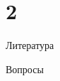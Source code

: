 \documentclass[12pt]{beamer}
\begin{document}
\part{2}

\begin{frame}[t]{Литература}

\end{frame}

\begin{frame}[t]{Вопросы}
\vspace{0.7cm}
 \\
\end{frame}
\end{document}
